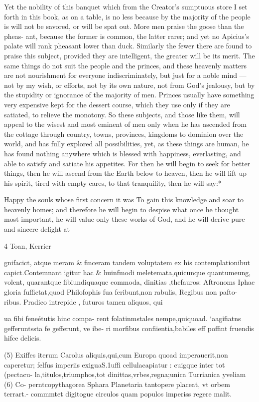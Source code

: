 \documentclass{article}
\begin{document}
{{{{{{Yet the nobility of this banquet which from the Creator’s sumptuous store I set
forth in this book, as on a table, is no less because by the majority of the people is
will not be savored, or will be spat out. More men praise the goose than the pheas-
ant, because the former is common, the latter rarer; and yet no Apicius’s palate
will rank pheasant lower than duck. Similarly the fewer there are found to praise
this subject, provided they are intelligent, the greater will be its merit. The same
things do not suit the people and the princes, and these heavenly matters are not
nourishment for everyone indiscriminately, but just for a noble mind — not by my
wish, or efforts, not by its own nature, not from God’s jealousy, but by the
stupidity or ignorance of the majority of men. Princes usually have something
very expensive kept for the dessert course, which they use only if they are satiated,
to relieve the monotony. So these subjects, and those like them, will appeal to the
wisest and most eminent of men only when he has ascended from the cottage
through country, towns, provinces, kingdoms to dominion over the world, and
has fully explored all possibilities, yet, as these things are human, he has found
nothing anywhere which is blessed with happiness, everlasting, and able to satisfy
and satiate his appetites. For then he will begin to seek for better things, then he
will ascend from the Earth below to heaven, then he will lift up his spirit, tired
with empty cares, to that tranquility, then he will say:*

Happy the souls whose first concern it was
To gain this knowledge and soar to heavenly homes;
and therefore he will begin to despise what once he thought most important, he
will value only these works of God, and he will derive pure and sincere delight at

4 Toan, Kerrier

gnifacict, atque meram & finceram tandem voluptatem ex his contemplationibut
capict.Contemnant igitur hac & huinfmodi meletemata,quicunque quantumeung,
volent, quarantque fibiundiquaque commoda, dinitias ,thefauros: Aftronoms
Iphac gloria fuffictat,quod Philofophis fua feribunt,non rabulis, Regibus non pafto-
ribus. Pradico intrepide , futuros tamen aliquos, qui {ua fibi feneétutis hinc compa-
rent folatinmstales nempe,quiquoad. ‘aagifiatns gefferuntssta fe gefferunt, ve ibe-
ri morfibus confiientia,babiles eff poffint fruendis hifce delicis.

(5) Exiffes iterum Carolus aliquis,qui,cum Europa quoad imperauerit,non
caperetur; felfus imperiis exiguaS.1uffi cellulacapiatur : cuigque inter tot (pectacu-
la,titulos,triumphos,tot dinittas,vrbes,regna;unica Turrianica yveliam (6) Co-
perntcopythagorea Sphara Planetaria tantopere placeat, vt orbem terrart.-%
commmtet digitogue circulos quam populos imperiss regere malit.

}}}}}}}
\end{document}
